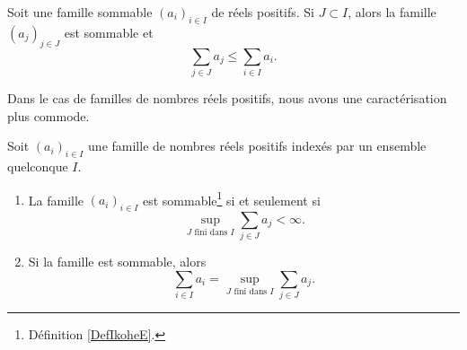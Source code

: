 \begin{lemma}   \label{LEMooAYFUooLMBBDn}
    Soit une famille sommable \( (a_i)_{i\in I}\) de réels positifs. Si \( J\subset I\), alors la famille \( (a_j)_{j\in J}\) est sommable et 
    \begin{equation}
        \sum_{j\in J}a_j\leq \sum_{i\in I} a_i.
    \end{equation}
\end{lemma}

Dans le cas de familles de nombres réels positifs, nous avons une caractérisation plus commode.
\begin{proposition}  \label{PROPooOYNRooQFpBly}  
	Soit \( (a_i)_{i\in I}\) une famille de nombres réels positifs indexés par un ensemble quelconque \( I\). 
    \begin{enumerate}
        \item       \label{ITEMooAYKKooVxXp}
            La famille \( (a_i)_{i\in I}\) est sommable\footnote{Définition \ref{DefIkoheE}.} si et seulement si
            \begin{equation}
                \sup_{ J\text{ fini dans } I}\sum_{j\in J}a_j<\infty.
            \end{equation}
        \item       \label{ITEMooSDCYooNsbHez}
            Si la famille est sommable, alors
            \begin{equation}
                \sum_{i\in I}a_i=\sup_{ J\text{ fini dans } I}\sum_{j\in J}a_j.
            \end{equation}
    \end{enumerate}
\end{proposition}

